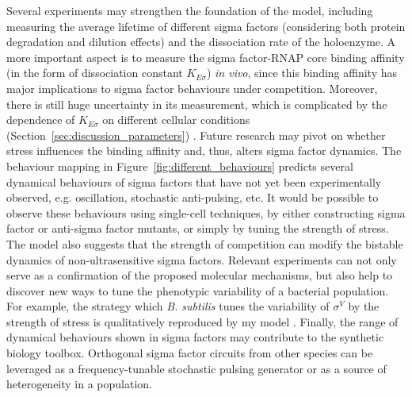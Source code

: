 Several experiments may strengthen the foundation of the model,
including measuring the average lifetime of different sigma factors
(considering both protein degradation and dilution effects)
and the dissociation rate of the holoenzyme.
A more important aspect is to measure the sigma factor-RNAP core
binding affinity (in the form of dissociation constant 
$K_{E\sigma}$) \textit{in vivo},
since this binding affinity has major implications to sigma factor
behaviours under competition.
Moreover, there is still huge uncertainty in its measurement,
which is complicated by the dependence of $K_{E\sigma}$ on
different cellular conditions (Section~\ref{sec:discussion_parameters})
\cite{ganguly12}.
Future research may pivot on whether stress influences the binding
affinity and, thus, alters sigma factor dynamics.
The behaviour mapping in Figure~\ref{fig:different_behaviours}
predicts several dynamical behaviours of sigma factors that have
not yet been experimentally observed,
e.g. oscillation, stochastic anti-pulsing, etc.
It would be possible to observe these behaviours using single-cell
techniques, by either constructing sigma factor or anti-sigma factor
mutants, or simply by tuning the strength of stress.
The model also suggests that the strength of competition can modify
the bistable dynamics of non-ultrasensitive sigma factors.
Relevant experiments can not only serve as a confirmation of the proposed
molecular mechanisms, but also help to discover new ways to tune
the phenotypic variability of a bacterial population.
For example, the strategy which \textit{B. subtilis} tunes the variability
of $\sigma^V$ by the strength of stress is qualitatively reproduced by my model
\cite{schwall21a}.
Finally, the range of dynamical behaviours shown in sigma factors may 
contribute to the synthetic biology toolbox.
Orthogonal sigma factor circuits from other species
can be leveraged as a frequency-tunable stochastic pulsing generator
or as a source of heterogeneity in a population.

